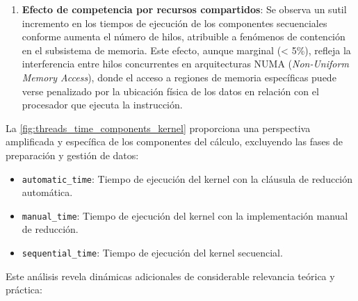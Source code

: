 \begin{enumerate}
            \item \textbf{Efecto de competencia por recursos compartidos}: Se observa un sutil incremento en los tiempos de ejecución de los componentes secuenciales conforme aumenta el número de hilos, atribuible a fenómenos de contención en el subsistema de memoria. Este efecto, aunque marginal (< 5\%), refleja la interferencia entre hilos concurrentes en arquitecturas NUMA (\textit{Non-Uniform Memory Access}), donde el acceso a regiones de memoria específicas puede verse penalizado por la ubicación física de los datos en relación con el procesador que ejecuta la instrucción.
            
        \end{enumerate}
    
        La \autoref{fig:threads_time_components_kernel} proporciona una perspectiva amplificada y específica de los componentes del cálculo, excluyendo las fases de preparación y gestión de datos:
        
        \begin{itemize}
        
            \item \texttt{automatic\_time}: Tiempo de ejecución del kernel con la cláusula de reducción automática.
            
            \item \texttt{manual\_time}: Tiempo de ejecución del kernel con la implementación manual de reducción.
            
            \item \texttt{sequential\_time}: Tiempo de ejecución del kernel secuencial.
            
        \end{itemize}
    
        Este análisis revela dinámicas adicionales de considerable relevancia teórica y práctica:
        
